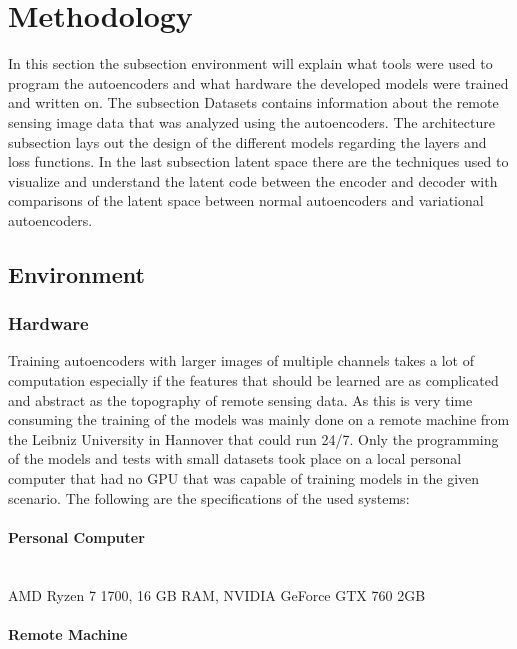 \section{Methodology}

In this section the subsection environment will explain what tools were used to program the autoencoders
and what hardware the developed models were trained and written on. The subsection Datasets 
contains information about the remote sensing image data that was analyzed using the autoencoders. 
The architecture subsection lays out 
the design of the different models regarding the layers and loss functions. In the last subsection 
latent space there are the techniques used to visualize and understand the latent code between the 
encoder and decoder with comparisons of the latent space between normal autoencoders and variational
autoencoders.

\subsection{Environment}

\subsubsection{Hardware}

Training autoencoders with larger images of multiple channels takes a lot of computation especially if the 
features that should be learned are as complicated and abstract as the topography of remote sensing data.
As this is very time consuming the training of the models was mainly done on a remote machine from the
Leibniz University in Hannover that could run 24/7. Only the
programming of the models and tests with small datasets took place on a local personal computer that had no
GPU that was capable of training models in the given scenario. The following
are the specifications of the used systems:\\

\paragraph{Personal Computer} \mbox{} \smallskip \\

AMD Ryzen 7 1700, 16 GB RAM, NVIDIA GeForce GTX 760 2GB

\paragraph{Remote Machine} \mbox{} \smallskip \\

